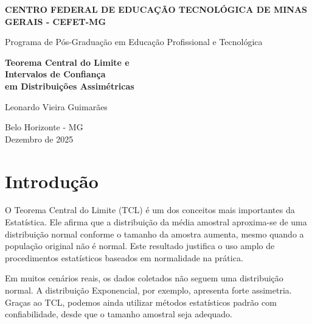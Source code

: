 \documentclass[12pt,a4paper]{article}
\newcommand{\capa}{%
    \thispagestyle{empty}%
}
\begin{document}
\capa
\begin{center}
\vspace*{1.5cm}

{\large \textbf{CENTRO FEDERAL DE EDUCAÇÃO TECNOLÓGICA DE MINAS GERAIS - CEFET-MG}} \\[0.2cm]

\vspace*{1.5cm}

{\normalsize Programa de Pós-Graduação em Educação Profissional e Tecnológica}

\vspace*{3cm}

{\LARGE \textbf{Teorema Central do Limite e \\ Intervalos de Confiança \\ em Distribuições Assimétricas}}

\vspace*{1cm}

{\large }

\vspace*{5cm}

{\large Leonardo Vieira Guimarães}

\vspace*{0.5cm}



\vspace*{\fill}

{Belo Horizonte - MG \\ Dezembro de 2025 }

\vspace*{0.5cm}

\end{center}

\newpage

\tableofcontents
\newpage

\section{Introdução}

O Teorema Central do Limite (TCL) é um dos conceitos mais importantes da Estatística. Ele afirma que a distribuição da média amostral aproxima-se de uma distribuição normal conforme o tamanho da amostra aumenta, mesmo quando a população original não é normal. Este resultado justifica o uso amplo de procedimentos estatísticos baseados em normalidade na prática.

Em muitos cenários reais, os dados coletados não seguem uma distribuição normal. A distribuição Exponencial, por exemplo, apresenta forte assimetria. Graças ao TCL, podemos ainda utilizar métodos estatísticos padrão com confiabilidade, desde que o tamanho amostral seja adequado.
\end{document}
